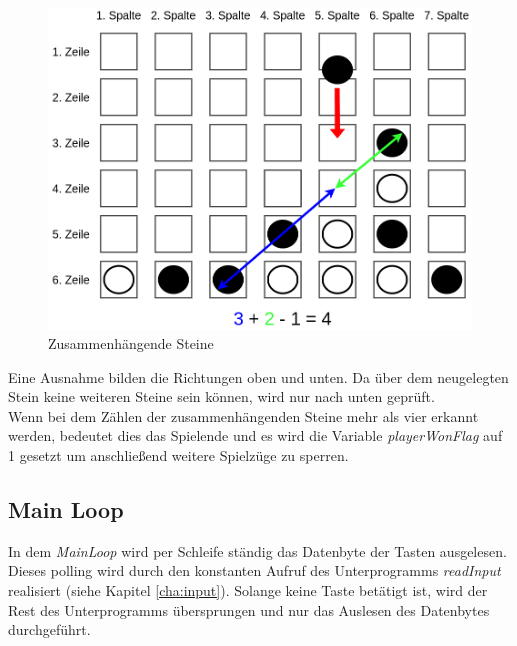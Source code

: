         \begin{figure}[H]
            \centering
            \includegraphics[scale=0.3]{img/gewinnbedingung.png}    
            \caption{Zusammenhängende Steine}
        \end{figure}

        Eine Ausnahme bilden die Richtungen oben und unten.
        Da über dem neugelegten Stein keine weiteren Steine sein können, wird nur nach unten geprüft.
        \\
        Wenn bei dem Zählen der zusammenhängenden Steine mehr als vier erkannt werden,
        bedeutet dies das Spielende und es wird die Variable \textit{playerWonFlag} auf 1 gesetzt um anschließend weitere Spielzüge zu sperren.

    \subsection{Main Loop}
        In dem \textit{MainLoop} wird per Schleife ständig das Datenbyte der Tasten ausgelesen.
        Dieses polling wird durch den konstanten Aufruf des Unterprogramms \textit{readInput} realisiert (siehe Kapitel \ref{cha:input}).
        Solange keine Taste betätigt ist, wird der Rest des Unterprogramms übersprungen und nur das Auslesen des Datenbytes durchgeführt.
      